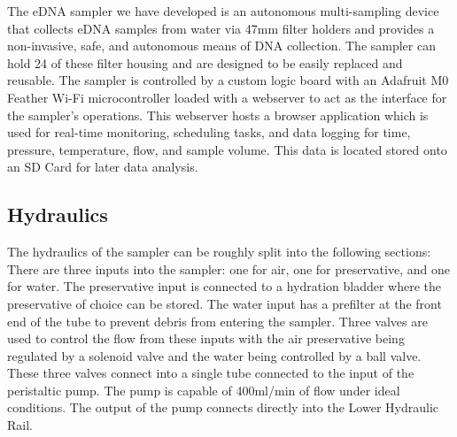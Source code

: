 \documentclass[11pt, letterpaper]{article}
\begin{document}



The eDNA sampler we have developed is an autonomous multi-sampling device that collects eDNA samples from water via 47mm filter holders and provides a non-invasive, safe, and autonomous means of DNA collection. The sampler can hold 24 of these filter housing and are designed to be easily replaced and reusable. The sampler is controlled by a custom logic board with an Adafruit M0 Feather Wi-Fi microcontroller loaded with a webserver to act as the interface for the sampler’s operations. This webserver hosts a browser application which is used for real-time monitoring, scheduling tasks, and data logging for time, pressure, temperature, flow, and sample volume. This data is located stored onto an SD Card for later data analysis. 


\subsection{Hydraulics}
The hydraulics of the sampler can be roughly split into the following sections:
There are three inputs into the sampler: one for air, one for preservative, and one for water. The preservative input is connected to a hydration bladder where the preservative of choice can be stored. The water input has a prefilter at the front end of the tube to prevent debris from entering the sampler. Three valves are used to control the flow from these inputs with the air preservative being regulated by a solenoid valve and the water being controlled by a ball valve. These three valves connect into a single tube connected to the input of the peristaltic pump.
The pump is capable of 400ml/min of flow under ideal conditions. The output of the pump connects directly into the Lower Hydraulic Rail. 
\end{document}
